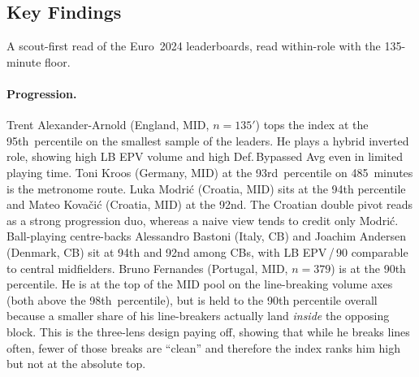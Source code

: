 \documentclass[12pt,a4paper]{article}
\begin{document}
\subsection{Key Findings}\label{sec:h1-findings}

A scout-first read of the Euro~2024 leaderboards, read within-role with the 135-minute floor.

\paragraph{Progression.}
Trent Alexander-Arnold (England, MID, $n=135'$) tops the index at the 95th~percentile on the smallest sample of the leaders. He plays a hybrid inverted role, showing high LB EPV volume and high Def.\,Bypassed Avg even in limited playing time.
Toni Kroos (Germany, MID) at the 93rd~percentile on 485~minutes is the metronome route.
Luka Modri\'{c} (Croatia, MID) sits at the 94th percentile and Mateo Kova\v{c}i\'{c} (Croatia, MID) at the 92nd. The Croatian double pivot reads as a strong progression duo, whereas a naive view tends to credit only Modri\'{c}.
Ball-playing centre-backs Alessandro Bastoni (Italy, CB) and Joachim Andersen (Denmark, CB) sit at 94th and 92nd among CBs, with LB EPV\,/\,90 comparable to central midfielders.
Bruno Fernandes (Portugal, MID, $n=379$) is at the 90th percentile. He is at the top of the MID pool on the line-breaking volume axes (both above the 98th~percentile), but is held to the 90th percentile overall because a smaller share of his line-breakers actually land \emph{inside} the opposing block. This is the three-lens design paying off, showing that while he breaks lines often, fewer of those breaks are ``clean'' and therefore the index ranks him high but not at the absolute top.
\end{document}
